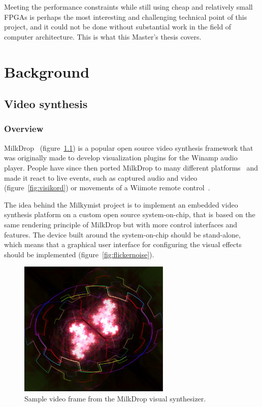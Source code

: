 \documentclass[a4paper,11pt]{kthesis}
\begin{document}
Meeting the performance constraints while still using cheap and relatively small FPGAs is perhaps the most interesting and challenging technical point of this project, and it could not be done without substantial work in the field of computer architecture. This is what this Master's thesis covers.

\chapter{Background}
\section{Video synthesis}
\subsection{Overview}
MilkDrop~\cite{milkdrop} (figure~\ref{fig:milkdrop}) is a popular open source video synthesis framework that was originally made to develop visualization plugins for the Winamp audio player. People have since then ported MilkDrop to many different platforms~\cite{wpmilkdrop} and made it react to live events, such as captured audio and video~\cite{visikord} (figure~\ref{fig:visikord}) or movements of a Wiimote remote control~\cite{wiimodemd}.

The idea behind the Milkymist project is to implement an embedded video synthesis platform on a custom open source system-on-chip, that is based on the same rendering principle of MilkDrop but with more control interfaces and features. The device built around the system-on-chip should be stand-alone, which means that a graphical user interface for configuring the visual effects should be implemented (figure~\ref{fig:flickernoise}).

\begin{figure}[htp]
\centering
\includegraphics[height=65mm]{milkdrop2.eps}
\caption{Sample video frame from the MilkDrop visual synthesizer.}
\label{fig:milkdrop}
\end{figure}
\end{document}
